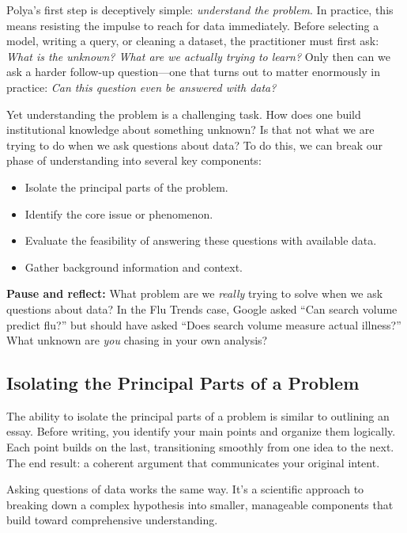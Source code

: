 Polya's first step is deceptively simple: \textit{understand the problem}. 
In practice, this means resisting the impulse to reach for data 
immediately. Before selecting a model, writing a query, or cleaning a 
dataset, the practitioner must first ask: \textit{What is the unknown? 
What are we actually trying to learn?} Only then can we ask a harder 
follow-up question---one that turns out to matter enormously in practice: 
\textit{Can this question even be answered with data?}

Yet understanding the problem is a challenging task. How does one build institutional knowledge about something unknown? Is that not what we are trying to do when we ask questions about data?
To do this, we can break our phase of understanding into several key components:
\begin{itemize}
    \item Isolate the principal parts of the problem.
    \item Identify the core issue or phenomenon.
    \item Evaluate the feasibility of answering these questions with available data.
    \item Gather background information and context.
\end{itemize}

\begin{checkpoint}
\textbf{Pause and reflect:} What problem are we \textit{really} trying to solve when we ask questions about data? In the Flu Trends case, Google asked ``Can search volume predict flu?'' but should have asked ``Does search volume measure actual illness?'' What unknown are \textit{you} chasing in your own analysis?
\end{checkpoint}

\subsection{Isolating the Principal Parts of a Problem}

The ability to isolate the principal parts of a problem is similar to outlining an essay.
Before writing, you identify your main points and organize them logically.
Each point builds on the last, transitioning smoothly from one idea to the next.
The end result: a coherent argument that communicates your original intent.

Asking questions of data works the same way.
It's a scientific approach to breaking down a complex hypothesis into smaller,
manageable components that build toward comprehensive understanding.

